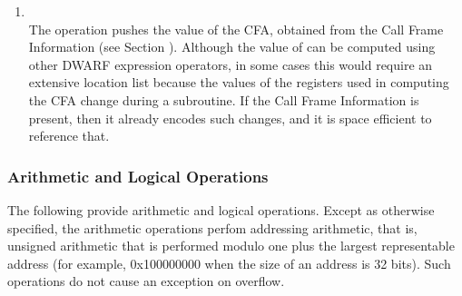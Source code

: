 \begin{enumerate}[1]
\item {} \\
The  operation pushes the value of the
CFA, obtained from the Call Frame Information 
(see Section ).
Although the value of 
can be computed using other DWARF expression operators,
in some cases this would require an extensive location list
because the values of the registers used in computing the
CFA change during a subroutine. If the 
Call Frame Information 
is present, then it already encodes such changes, and it is
space efficient to reference that.
\end{enumerate}

\subsubsection{Arithmetic and Logical Operations}
The following provide arithmetic and logical operations. Except
as otherwise specified, the arithmetic operations perfom
addressing arithmetic, that is, unsigned arithmetic that is
performed modulo one plus the largest representable address
(for example, 0x100000000 when the size of an address is 32
bits). Such operations do not cause an exception on overflow.

